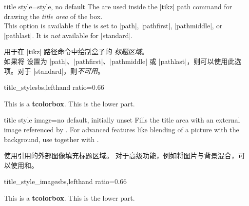 \begin{docTcbKey}{title style}{=}{style, no default}
The  are used inside the |tikz| path command
for drawing the \emph{title area} of the box.\\
This option is available if the  is set to
|path|, |pathfirst|, |pathmiddle|, or |pathlast|.
It is \emph{not} available for |standard|.

 用于在 |tikz| 路径命令中绘制盒子的 \emph{标题区域}。\\ 如果将  设置为 |path|、|pathfirst|、|pathmiddle| 或 |pathlast|，则可以使用此选项。对于 |standard|，则\emph{不可用}。
\begin{exdispExample*}{title_style}{sbs,lefthand ratio=0.66}

\begin{tcolorbox}[enhanced,title=My title,
title style={left color=blue!15!yellow,
              right color=red!85!black}]
This is a \textbf{tcolorbox}.
\tcblower
This is the lower part.
\end{tcolorbox}
\end{exdispExample*}
\end{docTcbKey}

\begin{docTcbKey}{title style image}{=}{no default, initially unset}
Fills the title area with an external image referenced by .
For advanced features like blending of a picture with the background,
use  together with .

使用引用的外部图像填充标题区域。 对于高级功能，例如将图片与背景混合，可以使用和。
\begin{exdispExample*}{title_style_image}{sbs,lefthand ratio=0.66}

\begin{tcolorbox}[enhanced,title=My title,
title style image=blueshade.png]
This is a \textbf{tcolorbox}.
\tcblower
This is the lower part.
\end{tcolorbox}
\end{exdispExample*}
\end{docTcbKey}

